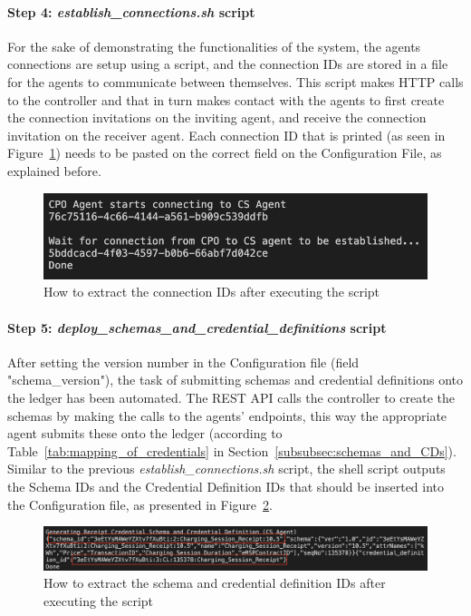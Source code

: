 \paragraph{Step 4: \textit{establish\_connections.sh} script}

For the sake of demonstrating the functionalities of the system, the agents connections are setup using a script, and the connection IDs are stored in a file for the agents to communicate between themselves. This script makes HTTP calls to the controller and that in turn makes contact with the agents to first create the connection invitations on the inviting agent, and receive the connection invitation on the receiver agent.
Each connection ID that is printed (as seen in Figure~\ref{fig:connections_screenshot}) needs to be pasted on the correct field on the Configuration File, as explained before.

\begin{figure}[!htb]
    \centering
    \includegraphics[width=0.6\linewidth]{images/connections_screenshot.png}
    \caption{How to extract the connection IDs after executing the script}
    \label{fig:connections_screenshot}
\end{figure}

\paragraph{Step 5: \textit{deploy\_schemas\_and\_credential\_definitions} script}

After setting the version number in the Configuration file (field "schema\_version"), the task of submitting schemas and credential definitions onto the ledger has been automated. The REST API calls the controller to create the schemas by making the calls to the agents' endpoints, this way the appropriate agent submits these onto the ledger (according to Table~\ref{tab:mapping_of_credentials} in Section~\ref{subsubsec:schemas_and_CDs}). Similar to the previous \textit{establish\_connections.sh} script, the shell script outputs the Schema IDs and the Credential Definition IDs that should be inserted into the Configuration file, as presented in Figure~\ref{fig:schemas_screenshot}.

\begin{figure}[!htb]
    \centering
    \includegraphics[width=0.8\linewidth]{images/schema_and_credential_definition.png}
    \caption{How to extract the schema and credential definition IDs after executing the script}
    \label{fig:schemas_screenshot}
\end{figure}


